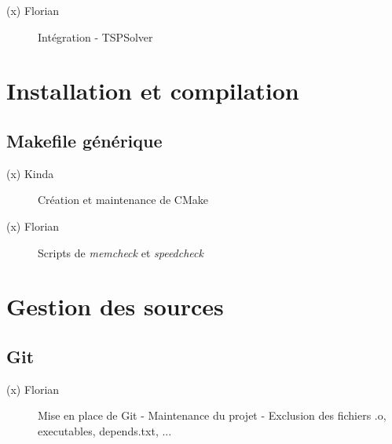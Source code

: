 \begin{description}
	\item [(x) Florian] Intégration - TSPSolver
\end{description}

\section{Installation et compilation}

\subsection{Makefile générique}

\begin{description}
	\item[(x) Kinda] Création et maintenance de CMake
	\item[(x) Florian] Scripts de \textit{memcheck} et \textit{speedcheck}
\end{description}

\section{Gestion des sources}

\subsection{Git}

\begin{description}
	\item[(x) Florian] Mise en place de Git - Maintenance du projet - Exclusion des fichiers .o, executables, depends.txt, ...
\end{description}
